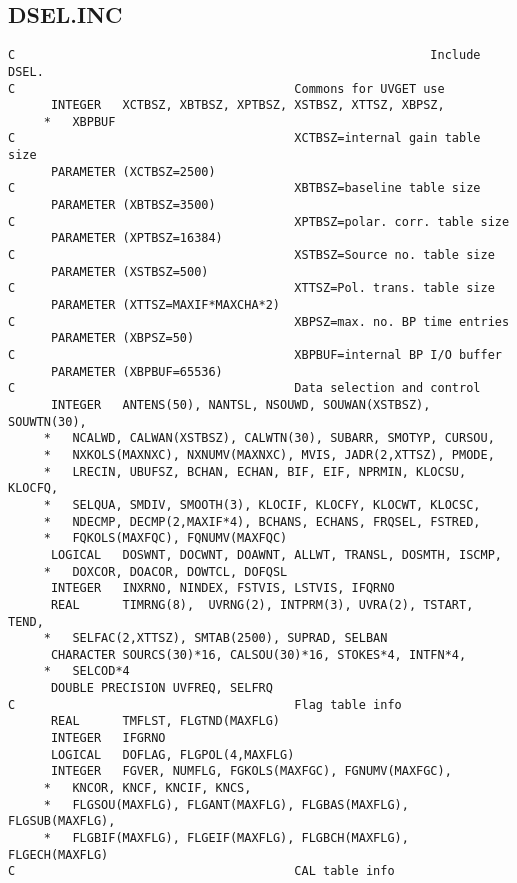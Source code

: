\subsection{DSEL.INC}

\begin{verbatim}
C                                                          Include DSEL.
C                                       Commons for UVGET use
      INTEGER   XCTBSZ, XBTBSZ, XPTBSZ, XSTBSZ, XTTSZ, XBPSZ,
     *   XBPBUF
C                                       XCTBSZ=internal gain table size
      PARAMETER (XCTBSZ=2500)
C                                       XBTBSZ=baseline table size
      PARAMETER (XBTBSZ=3500)
C                                       XPTBSZ=polar. corr. table size
      PARAMETER (XPTBSZ=16384)
C                                       XSTBSZ=Source no. table size
      PARAMETER (XSTBSZ=500)
C                                       XTTSZ=Pol. trans. table size
      PARAMETER (XTTSZ=MAXIF*MAXCHA*2)
C                                       XBPSZ=max. no. BP time entries
      PARAMETER (XBPSZ=50)
C                                       XBPBUF=internal BP I/O buffer
      PARAMETER (XBPBUF=65536)
C                                       Data selection and control
      INTEGER   ANTENS(50), NANTSL, NSOUWD, SOUWAN(XSTBSZ), SOUWTN(30),
     *   NCALWD, CALWAN(XSTBSZ), CALWTN(30), SUBARR, SMOTYP, CURSOU,
     *   NXKOLS(MAXNXC), NXNUMV(MAXNXC), MVIS, JADR(2,XTTSZ), PMODE,
     *   LRECIN, UBUFSZ, BCHAN, ECHAN, BIF, EIF, NPRMIN, KLOCSU, KLOCFQ,
     *   SELQUA, SMDIV, SMOOTH(3), KLOCIF, KLOCFY, KLOCWT, KLOCSC,
     *   NDECMP, DECMP(2,MAXIF*4), BCHANS, ECHANS, FRQSEL, FSTRED,
     *   FQKOLS(MAXFQC), FQNUMV(MAXFQC)
      LOGICAL   DOSWNT, DOCWNT, DOAWNT, ALLWT, TRANSL, DOSMTH, ISCMP,
     *   DOXCOR, DOACOR, DOWTCL, DOFQSL
      INTEGER   INXRNO, NINDEX, FSTVIS, LSTVIS, IFQRNO
      REAL      TIMRNG(8),  UVRNG(2), INTPRM(3), UVRA(2), TSTART, TEND,
     *   SELFAC(2,XTTSZ), SMTAB(2500), SUPRAD, SELBAN
      CHARACTER SOURCS(30)*16, CALSOU(30)*16, STOKES*4, INTFN*4,
     *   SELCOD*4
      DOUBLE PRECISION UVFREQ, SELFRQ
C                                       Flag table info
      REAL      TMFLST, FLGTND(MAXFLG)
      INTEGER   IFGRNO
      LOGICAL   DOFLAG, FLGPOL(4,MAXFLG)
      INTEGER   FGVER, NUMFLG, FGKOLS(MAXFGC), FGNUMV(MAXFGC),
     *   KNCOR, KNCF, KNCIF, KNCS,
     *   FLGSOU(MAXFLG), FLGANT(MAXFLG), FLGBAS(MAXFLG), FLGSUB(MAXFLG),
     *   FLGBIF(MAXFLG), FLGEIF(MAXFLG), FLGBCH(MAXFLG), FLGECH(MAXFLG)
C                                       CAL table info

\end{verbatim}
